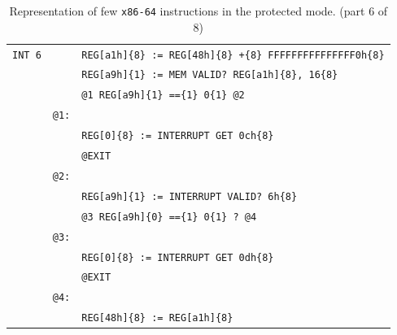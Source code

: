 \documentclass[10pt,twocolumn]{article}
\begin{document}
\begin{table}[!h]
\begin{center}
\begin{tabular}{r|rl}
\texttt{INT 6} & %
& \texttt{REG[a1h]\{8\} := REG[48h]\{8\} +\{8\} FFFFFFFFFFFFFFF0h\{8\}} \\ & %
& \texttt{REG[a9h]\{1\} := MEM VALID? REG[a1h]\{8\}, 16\{8\}} \\ & %
& \texttt{@1 REG[a9h]\{1\} ==\{1\} 0\{1\} @2} \\ & %
\texttt{@1:} \\ & %
& \texttt{REG[0]\{8\} := INTERRUPT GET 0ch\{8\}} \\ & %
& \texttt{@EXIT} \\ & %
\texttt{@2:} \\ & %
& \texttt{REG[a9h]\{1\} := INTERRUPT VALID? 6h\{8\}} \\ & %
& \texttt{@3 REG[a9h]\{0\} ==\{1\} 0\{1\} ? @4} \\ & %
\texttt{@3:} \\ & %
& \texttt{REG[0]\{8\} := INTERRUPT GET 0dh\{8\}} \\ & %
& \texttt{@EXIT} \\ & %
\texttt{@4:} \\ & %
& \texttt{REG[48h]\{8\} := REG[a1h]\{8\}} %

\end{tabular}
\end{center}
\caption{Representation of few \texttt{x86-64} instructions in the
protected mode. (part 6 of 8)}
\end{table}

\clearpage
\end{document}
